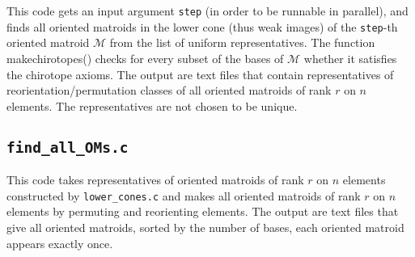 \documentclass[11pt,twoside,a4paper]{article}
\newcommand{\M}{\mathcal{M}}
\theoremstyle{definition}
\theoremstyle{plain}
\begin{document}
This code gets an input argument \texttt{step} (in order to be runnable in parallel), and finds all oriented matroids in the lower cone (thus weak images) of the \texttt{step}-th oriented matroid $\M$ from the list of uniform representatives. The function makechirotopes() checks for every subset of the bases of $\M$ whether it satisfies the chirotope axioms. The output are text files that contain representatives of reorientation/permutation classes of all oriented matroids of rank $r$ on $n$ elements. The representatives are not chosen to be unique. 


\subsection{\texttt{find\_all\_OMs.c}}

This code takes representatives of oriented matroids of rank $r$ on $n$ elements constructed by \texttt{lower\_cones.c} and makes all oriented matroids of rank $r$ on $n$ elements by permuting and reorienting elements. The output are text files that give all oriented matroids, sorted by the number of bases, each oriented matroid appears exactly once.


 
\end{document}
